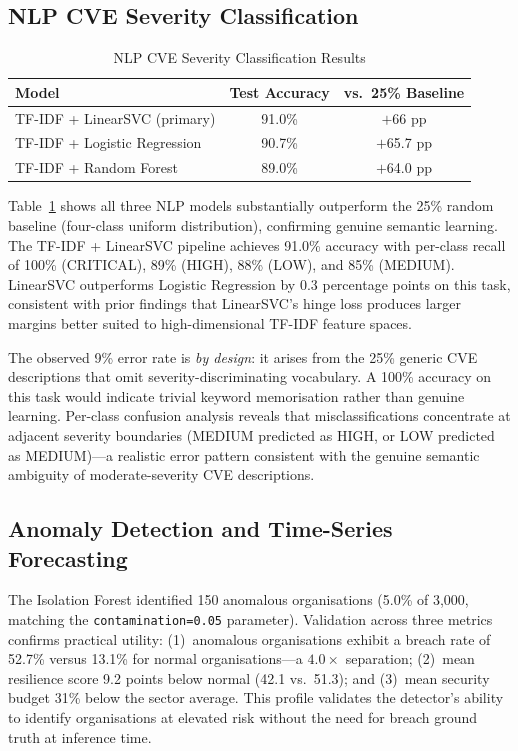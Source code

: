 \documentclass[journal]{IEEEtran}
\begin{document}
\subsection{NLP CVE Severity Classification}

\begin{table}[!t]
\renewcommand{\arraystretch}{1.3}
\caption{NLP CVE Severity Classification Results}
\label{tab:nlp}
\centering
\begin{tabular}{lcc}
\toprule
\textbf{Model} & \textbf{Test Accuracy} & \textbf{vs.\ 25\% Baseline} \\
\midrule
TF-IDF + LinearSVC (primary) & 91.0\% & $+$66 pp \\
TF-IDF + Logistic Regression & 90.7\% & $+$65.7 pp \\
TF-IDF + Random Forest       & 89.0\% & $+$64.0 pp \\
\bottomrule
\end{tabular}
\end{table}

Table~\ref{tab:nlp} shows all three NLP models substantially outperform the
25\% random baseline (four-class uniform distribution), confirming genuine
semantic learning. The TF-IDF + LinearSVC pipeline achieves 91.0\% accuracy
with per-class recall of 100\% (CRITICAL), 89\% (HIGH), 88\% (LOW), and
85\% (MEDIUM). LinearSVC outperforms Logistic Regression by 0.3 percentage
points on this task, consistent with prior findings that LinearSVC's hinge
loss produces larger margins better suited to high-dimensional TF-IDF
feature spaces.

The observed 9\% error rate is \emph{by design}: it arises from the 25\%
generic CVE descriptions that omit severity-discriminating vocabulary.
A 100\% accuracy on this task would indicate trivial keyword memorisation
rather than genuine learning. Per-class confusion analysis reveals that
misclassifications concentrate at adjacent severity boundaries (MEDIUM
predicted as HIGH, or LOW predicted as MEDIUM)---a realistic error pattern
consistent with the genuine semantic ambiguity of moderate-severity CVE
descriptions.

\subsection{Anomaly Detection and Time-Series Forecasting}

The Isolation Forest identified 150 anomalous organisations (5.0\% of 3,000,
matching the \texttt{contamination=0.05} parameter). Validation across three
metrics confirms practical utility: (1)~anomalous organisations exhibit a
breach rate of 52.7\% versus 13.1\% for normal organisations---a
$4.0\times$ separation; (2)~mean resilience score 9.2 points below normal
(42.1 vs.\ 51.3); and (3)~mean security budget 31\% below the sector
average. This profile validates the detector's ability to identify
organisations at elevated risk without the need for breach ground truth at
inference time.
\end{document}
